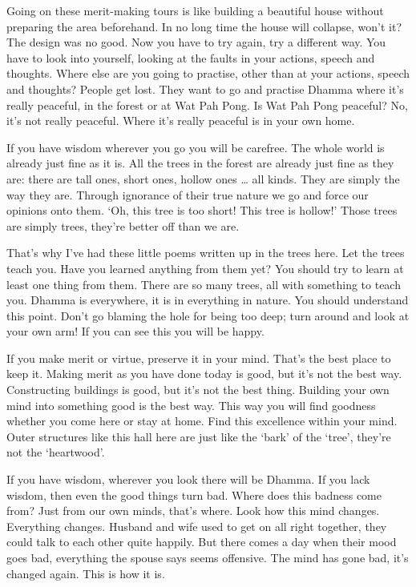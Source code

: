 Going on these merit-making tours is like building a beautiful house without preparing the area beforehand. In no long time the house will collapse, won't it? The design was no good. Now you have to try again, try a different way. You have to look into yourself, looking at the faults in your actions, speech and thoughts. Where else are you going to practise, other than at your actions, speech and thoughts? People get lost. They want to go and practise Dhamma where it's really peaceful, in the forest or at Wat Pah Pong. Is Wat Pah Pong peaceful? No, it's not really peaceful. Where it's really peaceful is in your own home. 

If you have wisdom wherever you go you will be carefree. The whole world is already just fine as it is. All the trees in the forest are already just fine as they are: there are tall ones, short ones, hollow ones \ldots{} all kinds. They are simply the way they are. Through ignorance of their true nature we go and force our opinions onto them. `Oh, this tree is too short! This tree is hollow!' Those trees are simply trees, they're better off than we are. 

That's why I've had these little poems written up in the trees here. Let the trees teach you. Have you learned anything from them yet? You should try to learn at least one thing from them. There are so many trees, all with something to teach you. Dhamma is everywhere, it is in everything in nature. You should understand this point. Don't go blaming the hole for being too deep; turn around and look at your own arm! If you can see this you will be happy. 

If you make merit or virtue, preserve it in your mind. That's the best place to keep it. Making merit as you have done today is good, but it's not the best way. Constructing buildings is good, but it's not the best thing. Building your own mind into something good is the best way. This way you will find goodness whether you come here or stay at home. Find this excellence within your mind. Outer structures like this hall here are just like the `bark' of the `tree', they're not the `heartwood'. 

If you have wisdom, wherever you look there will be Dhamma. If you lack wisdom, then even the good things turn bad. Where does this badness come from? Just from our own minds, that's where. Look how this mind changes. Everything changes. Husband and wife used to get on all right together, they could talk to each other quite happily. But there comes a day when their mood goes bad, everything the spouse says seems offensive. The mind has gone bad, it's changed again. This is how it is. 

